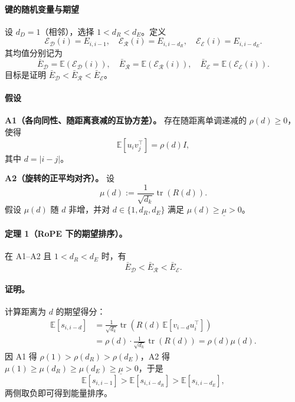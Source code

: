 \paragraph{键的随机变量与期望}
设 $d_D=1$（相邻），选择 $1<d_R<d_E$。定义
\begin{equation}
\mathcal{E}_{\mathcal{D}}(i)=E_{i,i-1},\quad 
\mathcal{E}_{\mathcal{R}}(i)=E_{i,i-d_R},\quad
\mathcal{E}_{\mathcal{E}}(i)=E_{i,i-d_E}.
\end{equation}
其均值分别记为
\begin{equation}
\bar E_{\mathcal{D}}=\mathbb{E}(\mathcal{E}_{\mathcal{D}}(i)),\quad
\bar E_{\mathcal{R}}=\mathbb{E}(\mathcal{E}_{\mathcal{R}}(i)),\quad
\bar E_{\mathcal{E}}=\mathbb{E}(\mathcal{E}_{\mathcal{E}}(i)).
\end{equation}
目标是证明 $\bar E_{\mathcal{D}}<\bar E_{\mathcal{R}}<\bar E_{\mathcal{E}}$。

\paragraph{假设}
\textbf{A1（各向同性、随距离衰减的互协方差）。}
存在随距离单调递减的 $\rho(d)\ge0$，使得
\begin{equation}
\mathbb{E}[u_i v_j^\top]=\rho(d)I,
\end{equation}
其中 $d=|i-j|$。

\textbf{A2（旋转的正平均对齐）。}
设
\begin{equation}
\mu(d):=\frac{1}{\sqrt{d_k}}\operatorname{tr}(R(d)).
\end{equation}
假设 \(\mu(d)\) 随 $d$ 非增，并对 $d\in\{1,d_R,d_E\}$ 满足 $\mu(d)\ge\underline{\mu}>0$。

\paragraph{定理 1（RoPE 下的期望排序）。}
在 A1--A2 且 $1<d_R<d_E$ 时，有
\begin{equation}
\bar E_{\mathcal{D}} < \bar E_{\mathcal{R}} < \bar E_{\mathcal{E}}.
\end{equation}

\paragraph{证明。}
计算距离为 $d$ 的期望得分：
\begin{align}
\mathbb{E}[s_{i,i-d}] &= \frac{1}{\sqrt{d_k}}\operatorname{tr}(R(d)\,\mathbb{E}[v_{i-d}u_i^\top]) \\
&= \rho(d)\cdot \frac{1}{\sqrt{d_k}}\operatorname{tr}(R(d)) = \rho(d)\mu(d).
\end{align}
因 A1 得 $\rho(1)>\rho(d_R)>\rho(d_E)$，A2 得 $\mu(1)\ge\mu(d_R)\ge\mu(d_E)\ge\underline{\mu}>0$，于是
\begin{equation}
\mathbb{E}[s_{i,i-1}]>\mathbb{E}[s_{i,i-d_R}]>\mathbb{E}[s_{i,i-d_E}],
\end{equation}
两侧取负即可得到能量排序。

